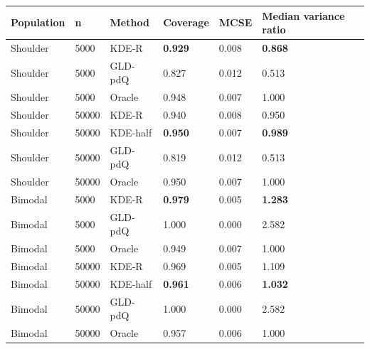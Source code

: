 \begin{tabular}{llllll}
\toprule
Population & n & Method & Coverage & MCSE & Median variance ratio \\
\midrule
Shoulder & 5000 & KDE-R & \textbf{0.929} & 0.008 & \textbf{0.868} \\
Shoulder & 5000 & GLD-pdQ & 0.827 & 0.012 & 0.513 \\
Shoulder & 5000 & Oracle & 0.948 & 0.007 & 1.000 \\
Shoulder & 50000 & KDE-R & 0.940 & 0.008 & 0.950 \\
Shoulder & 50000 & KDE-half & \textbf{0.950} & 0.007 & \textbf{0.989} \\
Shoulder & 50000 & GLD-pdQ & 0.819 & 0.012 & 0.513 \\
Shoulder & 50000 & Oracle & 0.950 & 0.007 & 1.000 \\
Bimodal & 5000 & KDE-R & \textbf{0.979} & 0.005 & \textbf{1.283} \\
Bimodal & 5000 & GLD-pdQ & 1.000 & 0.000 & 2.582 \\
Bimodal & 5000 & Oracle & 0.949 & 0.007 & 1.000 \\
Bimodal & 50000 & KDE-R & 0.969 & 0.005 & 1.109 \\
Bimodal & 50000 & KDE-half & \textbf{0.961} & 0.006 & \textbf{1.032} \\
Bimodal & 50000 & GLD-pdQ & 1.000 & 0.000 & 2.582 \\
Bimodal & 50000 & Oracle & 0.957 & 0.006 & 1.000 \\
\bottomrule
\end{tabular}
